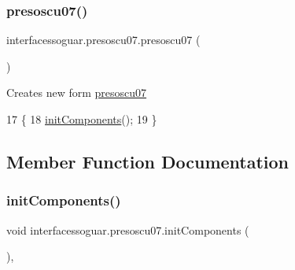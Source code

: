 \subsubsection{\texorpdfstring{presoscu07()}{presoscu07()}}
{\footnotesize\ttfamily interfacessoguar.\+presoscu07.\+presoscu07 (\begin{DoxyParamCaption}{ }\end{DoxyParamCaption})\hspace{0.3cm}{\ttfamily [inline]}}

Creates new form \mbox{\hyperlink{classinterfacessoguar_1_1presoscu07}{presoscu07}} 
\begin{DoxyCode}
17                         \{
18         \mbox{\hyperlink{classinterfacessoguar_1_1presoscu07_a3da6d5c21e9ab466a2b34f44bb664f70}{initComponents}}();
19     \}
\end{DoxyCode}


\subsection{Member Function Documentation}
\mbox{\label{classinterfacessoguar_1_1presoscu07_a3da6d5c21e9ab466a2b34f44bb664f70}} 
\subsubsection{\texorpdfstring{init\+Components()}{initComponents()}}
{\footnotesize\ttfamily void interfacessoguar.\+presoscu07.\+init\+Components (\begin{DoxyParamCaption}{ }\end{DoxyParamCaption})\hspace{0.3cm}{\ttfamily [inline]}, {\ttfamily [private]}}

